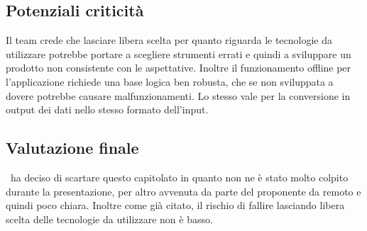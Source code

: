 \documentclass[../StudioDiFattibilita.tex]{subfiles}
\begin{document}
		\subsection{Potenziali criticità}
		Il team crede che lasciare libera scelta per quanto riguarda le tecnologie da utilizzare potrebbe portare a scegliere strumenti errati e quindi a sviluppare un prodotto non consistente con le aspettative. Inoltre il funzionamento offline per l'applicazione richiede una base logica ben robusta, che se non sviluppata a dovere potrebbe causare malfunzionamenti. Lo stesso vale per la conversione in output dei dati nello stesso formato dell'input.

	\subsection{Valutazione finale}  
	\kpanic\ ha deciso di scartare questo capitolato in quanto non ne è stato molto colpito durante la presentazione, per altro avvenuta da parte del proponente da remoto e quindi poco chiara. Inoltre come già citato, il rischio di fallire lasciando libera scelta delle tecnologie da utilizzare non è basso.
	
\end{document}
